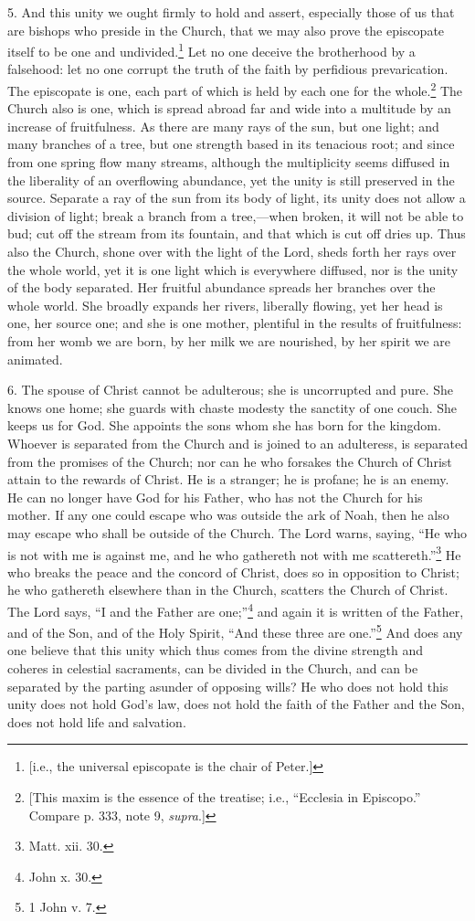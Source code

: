 5. And this unity we ought firmly to hold and assert, especially those of us that are bishops who preside in the Church, that we may also prove the episcopate itself to be one and undivided.\footnote{[i.e., the universal episcopate is the chair of Peter.]} Let no one deceive the brotherhood by a falsehood: let no one corrupt the truth of the faith by perfidious prevarication. The episcopate is one, each part of which is held by each one for the whole.\footnote{[This maxim is the essence of the treatise; i.e., “Ecclesia in Episcopo.” Compare p. 333, note 9, \emph{supra}.]} The Church also is one, which is spread abroad far and wide into a multitude by an increase of fruitfulness. As there are many rays of the sun, but one light; and many branches of a tree, but one strength based in its tenacious root; and since from one spring flow many streams, although the multiplicity seems diffused in the liberality of an overflowing abundance, yet the unity is still preserved in the source. Separate a ray of the sun from its body of light, its unity does not allow a division of light; break a branch from a tree,—when broken, it will not be able to bud; cut off the stream from its fountain, and that which is cut off dries up. Thus also the Church, shone over with the light of the Lord, sheds forth her rays over the whole world, yet it is one light which is everywhere diffused, nor is the unity of the body separated. Her fruitful abundance spreads her branches over the whole world. She broadly expands her rivers, liberally flowing, yet her head is one, her source one; and she is one mother, plentiful in the results of fruitfulness: from her womb we are born, by her milk we are nourished, by her spirit we are animated.

6. The spouse of Christ cannot be adulterous; she is uncorrupted and pure. She knows one home; she guards with chaste modesty the sanctity of one couch. She keeps us for God. She appoints the sons whom she has born for the kingdom. Whoever is separated from the Church and is joined to an adulteress, is separated from the promises of the Church; nor can he who forsakes the Church of Christ attain to the rewards of Christ. He is a stranger; he is profane; he is an enemy. He can no longer have God for his Father, who has not the Church for his mother. If any one could escape who was outside the ark of Noah, then he also may escape who shall be outside of the Church. The Lord warns, saying, “He who is not with me is against me, and he who gathereth not with me scattereth.”\footnote{Matt. xii. 30.} He who breaks the peace and the concord of Christ, does so in opposition to Christ; he who gathereth elsewhere than in the Church, scatters the Church of Christ. The Lord says, “I and the Father are one;”\footnote{John x. 30.} and again it is written of the Father, and of the Son, and of the Holy Spirit, “And these three are one.”\footnote{1 John v. 7.} And does any one believe that this unity which thus comes from the divine strength and coheres in celestial sacraments, can be divided in the Church, and can be separated by the parting asunder of opposing wills? He who does not hold this unity does not hold God’s law, does not hold the faith of the Father and the Son, does not hold life and salvation.

